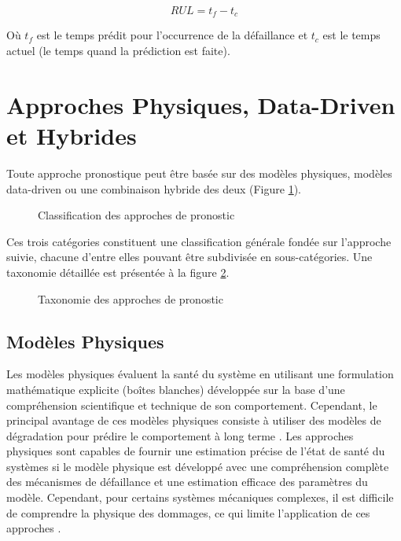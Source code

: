 \begin{equation}
    RUL = t_f-t_c
    \label{eq:rul}
\end{equation}

Où $t_f$ est le temps prédit pour l’occurrence de la défaillance et $t_c$ est le temps actuel (le temps quand la prédiction est faite).

\section{Approches Physiques, Data-Driven et Hybrides}
Toute approche pronostique peut être basée sur des modèles physiques, modèles data-driven ou une combinaison hybride des deux (Figure \ref{fig:prognostic-approaches-venn}).

\begin{figure}[h]
    \centering
	
    \caption{Classification des approches de pronostic}
    \label{fig:prognostic-approaches-venn}
\end{figure}

Ces trois catégories constituent une classification générale fondée sur l'approche suivie, chacune d'entre elles pouvant être subdivisée en sous-catégories. Une taxonomie détaillée est présentée à la figure \ref{fig:prognostic-approaches-tree}.
\begin{figure}[h]
	\resizebox{\textwidth}{!}{}
    \caption{Taxonomie des approches de pronostic \cite{Javed2017}}
    \label{fig:prognostic-approaches-tree}
\end{figure}

\subsection{Modèles Physiques}
Les modèles physiques évaluent la santé du système en utilisant une formulation mathématique explicite (boîtes blanches) développée sur la base d'une compréhension scientifique et technique de son comportement. Cependant, le principal avantage de ces modèles physiques consiste à utiliser des modèles de dégradation pour prédire le comportement à long terme \cite{Cubillo2016}. Les approches physiques sont capables de fournir une estimation précise de l'état de santé du systèmes si le modèle physique est développé avec une compréhension complète des mécanismes de défaillance et une estimation efficace des paramètres du modèle. Cependant, pour certains systèmes mécaniques complexes, il est difficile de comprendre la physique des dommages, ce qui limite l'application de ces approches \cite{Lei2018}.


